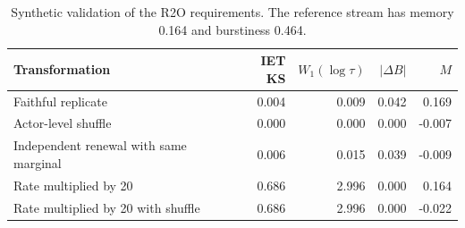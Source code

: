 \begin{table}[t]
\centering
\caption{Synthetic validation of the R2O requirements. The reference stream has memory 0.164 and burstiness 0.464.}
\label{tab:synthetic-validation}
\small
\begin{tabular}{lrrrr}
\toprule
Transformation & IET KS & $W_1(\log\tau)$ & $|\Delta B|$ & $M$ \\
\midrule
Faithful replicate & 0.004 & 0.009 & 0.042 & 0.169 \\
Actor-level shuffle & 0.000 & 0.000 & 0.000 & -0.007 \\
Independent renewal with same marginal & 0.006 & 0.015 & 0.039 & -0.009 \\
Rate multiplied by 20 & 0.686 & 2.996 & 0.000 & 0.164 \\
Rate multiplied by 20 with shuffle & 0.686 & 2.996 & 0.000 & -0.022 \\
\bottomrule
\end{tabular}
\end{table}
